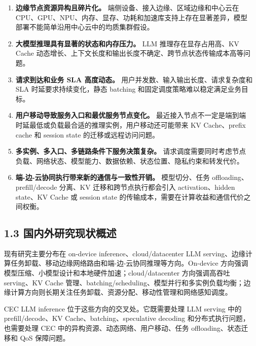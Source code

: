 \documentclass[a4paper,twocolumn,10pt]{ctexart}
\begin{document}
\begin{enumerate}
\item \textbf{边缘节点资源异构且碎片化。} 端侧设备、接入边缘、区域边缘和中心云在 CPU、GPU、NPU、内存、显存、功耗和加速库支持上存在显著差异，模型部署不能简单沿用中心云中的均质集群假设。

\item \textbf{大模型推理具有显著的状态和内存压力。} LLM 推理存在显存占用高、KV Cache 动态增长、上下文长度和输出长度不确定、跨节点状态传输成本高等问题。

\item \textbf{请求到达和业务 SLA 高度动态。} 用户并发数、输入输出长度、请求复杂度和 SLA 时延要求持续变化，静态 batching 和固定调度策略难以稳定满足业务目标。

\item \textbf{用户移动导致服务入口和最优服务节点变化。} 最近接入节点不一定是端到端时延最低或负载最合适的推理实例，用户移动还可能带来 KV Cache、prefix cache 和 session state 的迁移或远程访问问题。

\item \textbf{多实例、多入口、多链路条件下服务决策复杂。} 请求调度需要同时考虑节点负载、网络状态、模型能力、数据依赖、状态位置、隐私约束和转发代价。

\item \textbf{端-边-云协同执行带来新的通信与一致性开销。} 模型切分、任务 offloading、prefill/decode 分离、KV 迁移和跨节点执行都会引入 activation、hidden state、KV Cache 或 session state 的传输成本，需要在计算收益和通信代价之间权衡。

\end{enumerate}


\subsection{1.3 国内外研究现状概述}

现有研究主要分布在 on-device inference、cloud/datacenter LLM serving、边缘计算任务卸载、移动边缘网络路由和端-边-云协同推理等方向。On-device 方向强调模型压缩、小模型设计和本地硬件加速；cloud/datacenter 方向强调高吞吐 serving、KV Cache 管理、batching/scheduling、模型并行和多实例负载均衡；边缘计算方向则长期关注任务卸载、资源分配、移动性管理和网络感知调度。


CEC LLM inference 位于这些方向的交叉处。它既需要处理 LLM serving 中的 prefill/decode、KV Cache、batching、speculative decoding 和分布式执行问题，也需要处理 CEC 中的异构资源、动态网络、用户移动、任务 offloading、状态迁移和 QoS 保障问题。
\end{document}
